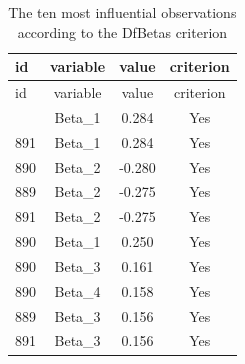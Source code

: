 \documentclass[
  english,
  12pt,
]{book}
\newenvironment{Shaded}{\begin{snugshade}}{\end{snugshade}}
\newcommand{\AttributeTok}[1]{\textcolor[rgb]{0.13,0.29,0.53}{#1}}
\newcommand{\DataTypeTok}[1]{\textcolor[rgb]{0.13,0.29,0.53}{#1}}
\newcommand{\DecValTok}[1]{\textcolor[rgb]{0.00,0.00,0.81}{#1}}
\newcommand{\FunctionTok}[1]{\textcolor[rgb]{0.13,0.29,0.53}{\textbf{#1}}}
\newcommand{\NormalTok}[1]{#1}
\newcommand{\OtherTok}[1]{\textcolor[rgb]{0.56,0.35,0.01}{#1}}
\newcommand{\SpecialCharTok}[1]{\textcolor[rgb]{0.81,0.36,0.00}{\textbf{#1}}}
\newcommand{\StringTok}[1]{\textcolor[rgb]{0.31,0.60,0.02}{#1}}
\begin{document}
\begin{Shaded}
\end{Shaded}

\begin{longtable}[]{@{}lccc@{}}
\caption{\label{tab:tab-dfbetas-influyentes}The ten most influential observations according to the DfBetas criterion}\tabularnewline
\toprule\noalign{}
id & variable & value & criterion \\
\midrule\noalign{}
\endfirsthead
\toprule\noalign{}
id & variable & value & criterion \\
\midrule\noalign{}
\endhead
\bottomrule\noalign{}
\endlastfoot
889 & Beta\_1 & 0.284 & Yes \\
891 & Beta\_1 & 0.284 & Yes \\
890 & Beta\_2 & -0.280 & Yes \\
889 & Beta\_2 & -0.275 & Yes \\
891 & Beta\_2 & -0.275 & Yes \\
890 & Beta\_1 & 0.250 & Yes \\
890 & Beta\_3 & 0.161 & Yes \\
890 & Beta\_4 & 0.158 & Yes \\
889 & Beta\_3 & 0.156 & Yes \\
891 & Beta\_3 & 0.156 & Yes \\
\end{longtable}
\end{document}
